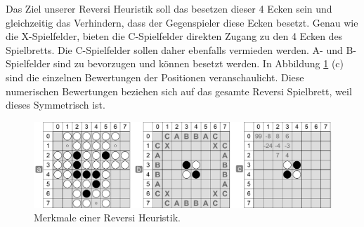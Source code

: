 Das Ziel unserer Reversi Heuristik soll das besetzen dieser 4 Ecken sein und gleichzeitig das Verhindern, dass der Gegenspieler diese Ecken besetzt. Genau wie die X-Spielfelder, bieten die C-Spielfelder direkten Zugang zu den 4 Ecken des Spielbretts. Die C-Spielfelder sollen daher ebenfalls vermieden werden. A- und B-Spielfelder sind zu bevorzugen und können besetzt werden. In Abbildung \ref{fig:reversi_movement_notation_positioning} (c) sind die einzelnen Bewertungen der Positionen veranschaulicht. Diese numerischen Bewertungen beziehen sich auf das gesamte Reversi Spielbrett, weil dieses Symmetrisch ist.


\begin{figure}[!htbp]
  \centering
  \includegraphics[scale = 0.5]{inhalt/abbildungen/reversi_movement_notation_positioning.pdf}
  \caption{Merkmale einer Reversi Heuristik.}
  \label{fig:reversi_movement_notation_positioning}
\end{figure}
